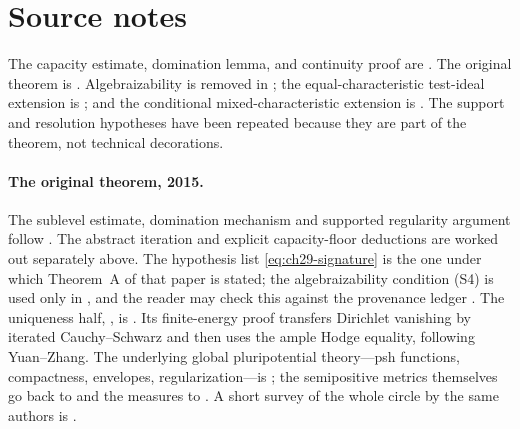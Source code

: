 \section*{Source notes}

The capacity estimate, domination lemma, and continuity proof are
\cite[Lemmas~8.3--8.4 and \S8.3]{BFJ15}.  The original theorem is
\cite[Theorem~8.1]{BFJ15}.  Algebraizability is removed in
\cite{BGGJKM20}; the equal-characteristic test-ideal extension is
\cite{GJKM19}; and the conditional mixed-characteristic extension is
\cite{FGK25}.  The support and resolution hypotheses have been repeated
because they are part of the theorem, not technical decorations.

\paragraph{The original theorem, 2015.}
The sublevel estimate, domination mechanism and supported regularity
argument follow \cite[\S8]{BFJ15}.  The abstract iteration and explicit
capacity-floor deductions are worked out separately above.  The hypothesis list \eqref{eq:ch29-signature} is the one
under which Theorem~A of that paper is stated; the algebraizability
condition \textup{(S4)} is used only in
\cite[Appendix~A]{BFJ15}, and the reader may check this against the
provenance ledger .  The uniqueness half,
, is
\cite[Proposition~8.2]{BFJ15}.  Its finite-energy proof transfers
Dirichlet vanishing by iterated Cauchy--Schwarz and then uses the ample
Hodge equality, following Yuan--Zhang.  The underlying global pluripotential
theory---psh functions, compactness, envelopes, regularization---is
\cite{BFJ16}; the semipositive metrics themselves go back to
\cite{Zhang1995} and the measures to \cite{CL06}.  A short survey of the
whole circle by the same authors is \cite{BFJ16b}.

